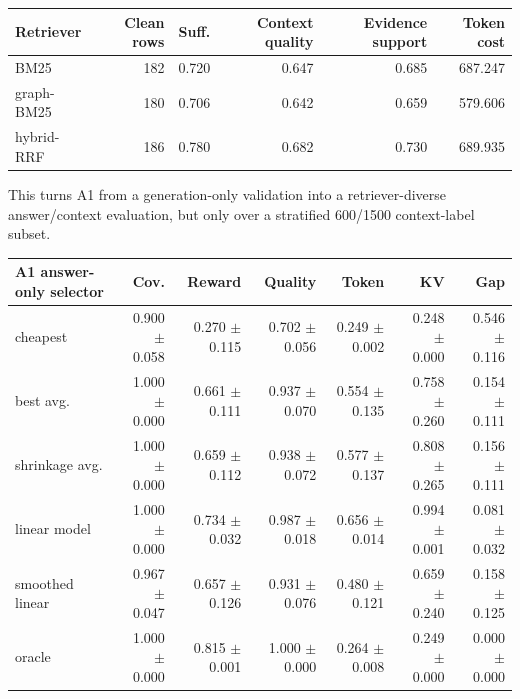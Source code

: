 \begin{center}
\small
\begin{tabular}{l r r r r r}
\toprule
Retriever & Clean rows & Suff. & Context quality & Evidence support & Token cost \\
\midrule
BM25 & 182 & 0.720 & 0.647 & 0.685 & 687.247 \\
graph-BM25 & 180 & 0.706 & 0.642 & 0.659 & 579.606 \\
hybrid-RRF & 186 & 0.780 & 0.682 & 0.730 & 689.935 \\
\bottomrule
\end{tabular}
\end{center}

This turns A1 from a generation-only validation into a retriever-diverse answer/context evaluation, but only over a stratified 600/1500 context-label subset.

{\tiny
\begin{longtable}{>{\raggedright\arraybackslash}p{2.8cm} r r r r r r}
\toprule
A1 answer-only selector & Cov. & Reward & Quality & Token & KV & Gap \\
\midrule
cheapest & 0.900 $\pm$ 0.058 & 0.270 $\pm$ 0.115 & 0.702 $\pm$ 0.056 & 0.249 $\pm$ 0.002 & 0.248 $\pm$ 0.000 & 0.546 $\pm$ 0.116 \\
best avg. & 1.000 $\pm$ 0.000 & 0.661 $\pm$ 0.111 & 0.937 $\pm$ 0.070 & 0.554 $\pm$ 0.135 & 0.758 $\pm$ 0.260 & 0.154 $\pm$ 0.111 \\
shrinkage avg. & 1.000 $\pm$ 0.000 & 0.659 $\pm$ 0.112 & 0.938 $\pm$ 0.072 & 0.577 $\pm$ 0.137 & 0.808 $\pm$ 0.265 & 0.156 $\pm$ 0.111 \\
linear model & 1.000 $\pm$ 0.000 & 0.734 $\pm$ 0.032 & 0.987 $\pm$ 0.018 & 0.656 $\pm$ 0.014 & 0.994 $\pm$ 0.001 & 0.081 $\pm$ 0.032 \\
smoothed linear & 0.967 $\pm$ 0.047 & 0.657 $\pm$ 0.126 & 0.931 $\pm$ 0.076 & 0.480 $\pm$ 0.121 & 0.659 $\pm$ 0.240 & 0.158 $\pm$ 0.125 \\
oracle & 1.000 $\pm$ 0.000 & 0.815 $\pm$ 0.001 & 1.000 $\pm$ 0.000 & 0.264 $\pm$ 0.008 & 0.249 $\pm$ 0.000 & 0.000 $\pm$ 0.000 \\
\bottomrule
\end{longtable}
}

